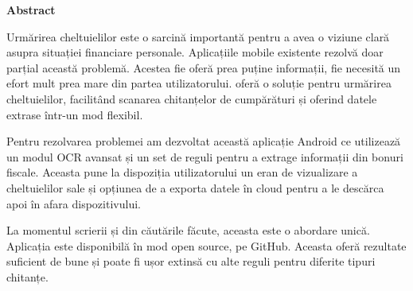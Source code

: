 \begin{center}
  \vspace*{\abstractTop}
  \huge
  \textbf{Abstract}
  \vspace*{\abstractBottom}
\end{center}

\normalsize
Urmărirea cheltuielilor este o sarcină importantă pentru a avea o viziune clară asupra situației financiare personale. Aplicațiile mobile existente rezolvă doar parțial această problemă. Acestea fie oferă prea puține informații, fie necesită un efort mult prea mare din partea utilizatorului. \AppName{} oferă o soluție pentru urmărirea cheltuielilor, facilitând scanarea chitanțelor de cumpărături și oferind datele extrase într-un mod flexibil.

Pentru rezolvarea problemei am dezvoltat această aplicație Android ce utilizează un modul OCR avansat și un set de reguli pentru a extrage informații din bonuri fiscale. Aceasta pune la dispoziția utilizatorului un eran de vizualizare a cheltuielilor sale și opțiunea de a exporta datele în cloud pentru a le descărca apoi în afara dispozitivului.

La momentul scrierii și din căutările făcute, aceasta este o abordare unică. Aplicația este disponibilă în mod open source, pe GitHub. Aceasta oferă rezultate suficient de bune și poate fi ușor extinsă cu alte reguli pentru diferite tipuri chitanțe.

\clearpage